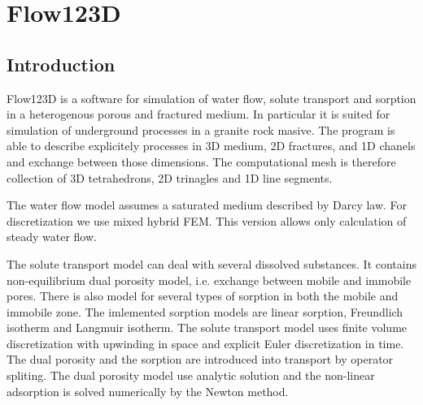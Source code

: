 %
%
%
%

\setcounter{page}{2}

\section*{Flow123D}

\subsection*{Introduction}
Flow123D is a software for simulation of water flow, solute transport and sorption in a heterogenous 
porous and fractured medium. In particular it is suited for simulation of underground processes in a granite rock masive.
The program is able to describe explicitely processes in 3D medium, 2D fractures, and 1D chanels and exchange between those dimensions.
The computational mesh is therefore collection of 3D tetrahedrons, 2D trinagles and 1D line segments.

The water flow model assumes a saturated medium described by Darcy law. For discretization we use mixed hybrid FEM. This version
allows only calculation of steady water flow. 

The solute transport model can deal with several dissolved substances. It contains non-equilibrium dual porosity model, 
i.e. exchange between mobile and immobile 
pores. There is also model for several types of sorption in both the mobile and immobile zone. The imlemented sorption models are
linear sorption, Freundlich isotherm and Langmuir isotherm. The solute transport model uses finite volume discretization 
with upwinding in space and explicit Euler discretization in time. The dual porosity and the sorption are introduced into transport by operator spliting.
The dual porosity model use analytic solution and the non-linear adsorption is solved numerically by the Newton method.

